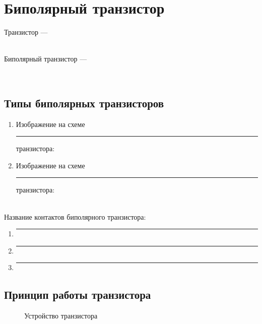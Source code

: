 \section{Биполярный транзистор}    

Транзистор --- \hrulefill

\hrulefill

\hrulefill
\\
Биполярный транзистор --- \hrulefill

\hrulefill

\hrulefill
\\

\subsection{Типы биполярных транзисторов}

\begin{enumerate}
	\item \hrulefill

Изображение на схеме \rule{2cm}{0.25pt} транзистора:


	\item \hrulefill

Изображение на схеме \rule{2cm}{0.25pt} транзистора:

\end{enumerate}
\\
Название контактов биполярного транзистора:

\begin{enumerate}
	\item \rule{5cm}{0.25pt}
	\item \rule{5cm}{0.25pt}
	\item \rule{5cm}{0.25pt}
\end{enumerate}

\subsection{Принцип работы транзистора}

\begin{figure}[h]
\centering
{}
\caption{Устройство транзистора}
\end{figure}

